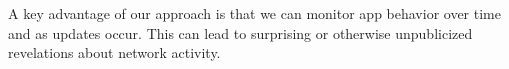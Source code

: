 

A key advantage of our approach is that we can monitor app behavior 
over time and as updates occur. This can lead to surprising or otherwise 
unpublicized revelations about network activity.

